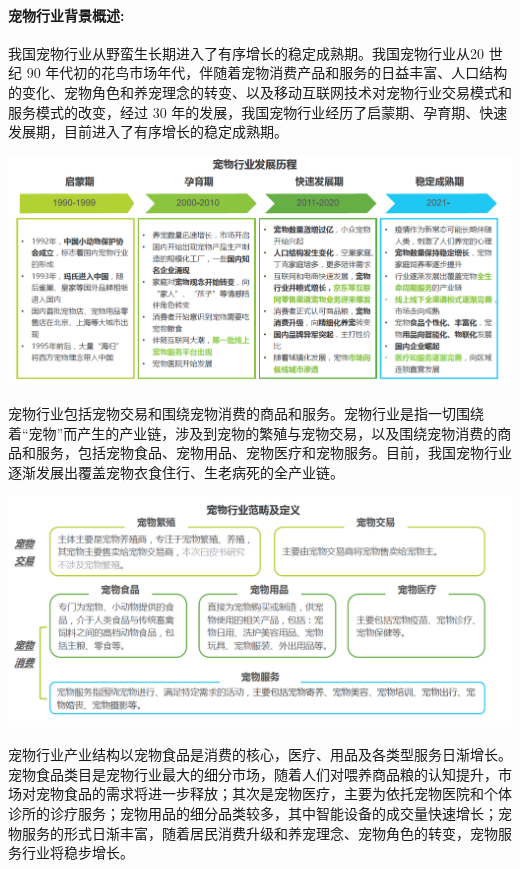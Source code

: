 \documentclass[a4paper]{ctexart}
\begin{document}
\paragraph{宠物行业背景概述:}
我国宠物行业从野蛮生长期进入了有序增长的稳定成熟期。我国宠物行业从20 世纪 90 年代初的花鸟市场年代，伴随着宠物消费产品和服务的日益丰富、人口结构的变化、宠物角色和养宠理念的转变、以及移动互联网技术对宠物行业交易模式和服务模式的改变，经过 30 年的发展，我国宠物行业经历了启蒙期、孕育期、快速发展期，目前进入了有序增长的稳定成熟期。
\begin{center}
  \includegraphics[width=16cm]{./assets/宠物行业发展历程.png}
\end{center}
宠物行业包括宠物交易和围绕宠物消费的商品和服务。宠物行业是指一切围绕着“宠物”而产生的产业链，涉及到宠物的繁殖与宠物交易，以及围绕宠物消费的商品和服务，包括宠物食品、宠物用品、宠物医疗和宠物服务。目前，我国宠物行业逐渐发展出覆盖宠物衣食住行、生老病死的全产业链。
\begin{center}
  \includegraphics[width=16cm]{./assets/宠物行业范畴.png}
\end{center}
宠物行业产业结构以宠物食品是消费的核心，医疗、用品及各类型服务日渐增长。宠物食品类目是宠物行业最大的细分市场，随着人们对喂养商品粮的认知提升，市场对宠物食品的需求将进一步释放；其次是宠物医疗，主要为依托宠物医院和个体诊所的诊疗服务；宠物用品的细分品类较多，其中智能设备的成交量快速增长；宠物服务的形式日渐丰富，随着居民消费升级和养宠理念、宠物角色的转变，宠物服务行业将稳步增长。
\end{document}
